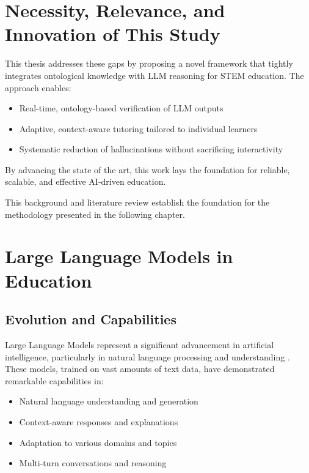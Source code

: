 
\section{Necessity, Relevance, and Innovation of This Study}

This thesis addresses these gaps by proposing a novel framework that tightly integrates ontological knowledge with LLM reasoning for STEM education. The approach enables:
\begin{itemize}
    \item Real-time, ontology-based verification of LLM outputs
    \item Adaptive, context-aware tutoring tailored to individual learners
    \item Systematic reduction of hallucinations without sacrificing interactivity
\end{itemize}
By advancing the state of the art, this work lays the foundation for reliable, scalable, and effective AI-driven education.


This background and literature review establish the foundation for the methodology presented in the following chapter.

\section{Large Language Models in Education}

\subsection{Evolution and Capabilities}
Large Language Models represent a significant advancement in artificial intelligence, particularly in natural language processing and understanding \cite{ji2023survey}. These models, trained on vast amounts of text data, have demonstrated remarkable capabilities in:

\begin{itemize}
    \item Natural language understanding and generation
    \item Context-aware responses and explanations
    \item Adaptation to various domains and topics
    \item Multi-turn conversations and reasoning
\end{itemize}


